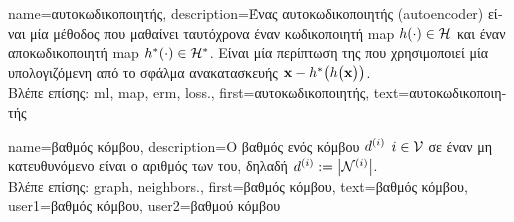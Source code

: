 {name={\foreignlanguage{greek}{αυτοκωδικοποιητής}},
	description={\foreignlanguage{greek}{Ένας αυτοκωδικοποιητής} (autoencoder) 
		\foreignlanguage{greek}{είναι μία μέθοδος}  \foreignlanguage{greek}{που μαθαίνει ταυτόχρονα έναν κωδικοποιητή} \gls{map} 
		$h(\cdot) \in \mathcal{H}$ \foreignlanguage{greek}{και έναν αποκωδικοποιητή} \gls{map} 
		$h^{*}(\cdot) \in \mathcal{H}^{*}$. \foreignlanguage{greek}{Είναι μία περίπτωση της} 
		 \foreignlanguage{greek}{που χρησιμοποιεί μία}  \foreignlanguage{greek}{υπολογιζόμενη από το 
		σφάλμα ανακατασκευής} ${\bf x} - h^{*}\big(  h \big( {\bf x} \big) \big)$.\\
		\foreignlanguage{greek}{Βλέπε επίσης:} \gls{ml}, \gls{map}, \gls{erm}, \gls{loss}.},
	first={\foreignlanguage{greek}{αυτοκωδικοποιητής}},
	text={\foreignlanguage{greek}{αυτοκωδικοποιητής}}
}

{name={\foreignlanguage{greek}{βαθμός κόμβου}},
	description={\foreignlanguage{greek}{Ο βαθμός ενός κόμβου} 
		$d^{(i)}$ $i \in \mathcal{V}$ \foreignlanguage{greek}{σε έναν μη κατευ\-θυ\-νόμενο} 
		 \foreignlanguage{greek}{είναι ο αριθμός των}   
		\foreignlanguage{greek}{του, δηλαδή} $d^{(i)} := \big|\mathcal{N}^{(i)}\big|$.\\
		\foreignlanguage{greek}{Βλέπε επίσης:} \gls{graph}, \gls{neighbors}.},
	first={\foreignlanguage{greek}{βαθμός κόμβου}},
	text={\foreignlanguage{greek}{βαθμός κόμβου}},
	user1={\foreignlanguage{greek}{βαθμός κόμβου}}, %
  	user2={\foreignlanguage{greek}{βαθμού κόμβου}} %
}

